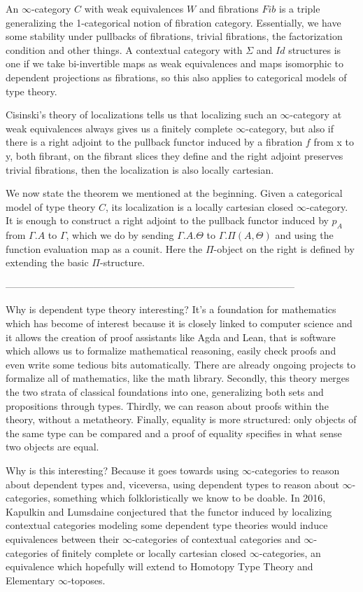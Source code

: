 \documentclass{minimal}
\newcommand{\Id}{Id}
\begin{document}
An $\infty$-category $C$ with weak equivalences $W$ and fibrations $Fib$ is a
triple generalizing the 1-categorical notion of fibration category. Essentially,
we have some stability under pullbacks of fibrations, trivial fibrations, the
factorization condition and other things. A contextual category with $\Sigma$
and $\Id$ structures is one if we take bi-invertible maps as weak equivalences
and maps isomorphic to dependent projections as fibrations, so this also applies
to categorical models of type theory.

Cisinski's theory of localizations tells us that localizing such an
$\infty$-category at weak equivalences always gives us a finitely complete
$\infty$-category, but also if there is a right adjoint to the pullback functor
induced by a fibration $f$ from x to y, both fibrant, on the fibrant slices they
define and the right adjoint preserves trivial fibrations, then the localization
is also locally cartesian.

We now state the theorem we mentioned at the beginning. Given a categorical
model of type theory $C$, its localization is a locally cartesian closed
$\infty$-category. It is enough to construct a right adjoint to the pullback
functor induced by $p_A$ from $\Gamma.A$ to $\Gamma$, which we do by sending
$\Gamma.A.\Theta$ to $\Gamma.\Pi(A,\Theta)$ and using the function evaluation
map as a counit. Here the $\Pi$-object on the right
is defined by extending the basic $\Pi$-structure.

\noindent
-----------------------------------------------------------------------------------------

Why is dependent type theory interesting? It's a foundation for mathematics
which has become of interest because it is closely linked to computer science
and it allows the creation of proof assistants like Agda and Lean, that is
software which allows us to formalize mathematical reasoning, easily check
proofs and even write some tedious bits automatically. There are already ongoing
projects to formalize all of mathematics, like the math library. Secondly, this
theory merges the two strata of classical foundations into one, generalizing
both sets and propositions through types. Thirdly, we can reason about proofs
within the theory, without a metatheory. Finally, equality is more structured:
only objects of the same type can be compared and a proof of equality specifies
in what sense two objects are equal.

Why is this interesting? Because it goes towards using $\infty$-categories to
reason about dependent types and, viceversa, using dependent types to reason
about $\infty$-categories, something which folkloristically we know to be
doable. In 2016, Kapulkin and Lumsdaine conjectured that the functor induced by
localizing contextual categories modeling some dependent type theories
would induce equivalences between their $\infty$-categories of contextual
categories and $\infty$-categories of finitely complete or locally cartesian
closed $\infty$-categories, an equivalence which hopefully will extend to
Homotopy Type Theory and Elementary $\infty$-toposes.
\end{document}
